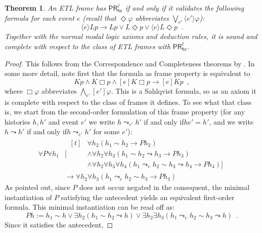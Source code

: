 \documentclass{article}
\newcommand{\PRhcl}{\ensuremath{\mathsf{PR_{hc}^\ell}}\xspace}
\newcommand{\acc}{\sim}
\newcommand{\nextstep}{\Diamond}
\newcommand{\after}[1]{\langle#1\rangle}
\newcommand{\nextstepall}{\Box}
\newcommand{\afterall}[1]{[#1]}
\renewcommand{\implies}{\rightarrow}
\renewcommand{\phi}{\varphi}
\newcommand{\tiff}{if and only if\xspace}
\newcommand{\mpunct}{\enspace}
\newcounter{#1}
\newtheorem{theorem}{Theorem}[section]
\begin{document}
\begin{theorem}
\label{result:pr-hcl-definable}
  An ETL frame has \PRhcl \tiff it validates the following formula for each event $e$
  (recall that $\nextstep\phi$ abbreviates $\bigvee_{e'}\after{e'} \phi$):
  \begin{equation}
    \label{eq:axiom-pr-hcl}\tag{$\star$}
    \after e L p\implies L p \vee L\nextstep p \vee \after e L \nextstep p\mpunct.
  \end{equation}
  Together with the normal modal logic axioms and deduction rules,
  it is sound and complete with respect to the class of ETL frames with \PRhcl.
\end{theorem}
\begin{proof}
  This follows from the Correspondence and Completeness theorems by \citet{sahlqvist_completeness_1975}.
  In some more detail, note first that the formula as frame property is equivalent to
  \[
  K p \wedge K\nextstepall p \wedge \afterall e K \nextstepall p \implies \afterall e K p\mpunct,
  \]
  where $\nextstepall\phi$ abbreviates $\bigwedge_{e'}\afterall{e'}\phi$.
  This is a Sahlqvist formula, so as an axiom it is complete
  with respect to the class of frames it defines.
  To see what that class is, we start from the second-order formulation of this frame property
  (for any histories $h,h'$ and event $e'$ we write $h\leadsto_{e'}h'$ \tiff $he'=h'$,
  and we write $h\leadsto h'$ \tiff $h\leadsto_{e'}h'$ for some $e'$):
  \begin{align*}
    \forall P\forall h_1&\big[
    \begin{aligned}[t]
      &\forall h_2 (h_1\acc h_2\implies P h_2)\\
      &\wedge\forall h_2\forall h_3(h_1\acc h_2\leadsto h_3 \implies P h_3)\\
      &\wedge\forall h_2\forall h_3\forall h_4(h_1\leadsto_e h_2\acc h_3\leadsto h_4\implies P h_4)\big]
    \end{aligned}\\
    &\implies\forall h_2\forall h_3(h_1\leadsto_e h_2\acc h_3\implies P h_3)
  \end{align*}
  As \citeauthor{sahlqvist_completeness_1975} pointed out,
  since $P$ does not occur negated in the consequent,
  the minimal instantiation of $P$ satisfying the antecedent
  yields an equivalent first-order formula.
  This minimal instantiation can be read off as:
  \[
  P h := h_1\acc h\vee\exists h_2(h_1\acc h_2\leadsto h)\vee
  \exists h_2\exists h_3(h_1\leadsto_e h_2\acc h_3\leadsto h)\mpunct.
  \]
  Since it satisfies the antecedent,

\end{proof}
\end{document}
